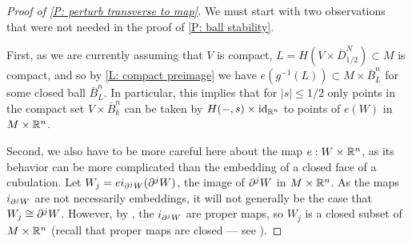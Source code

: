 \begin{proof}[Proof of \cref{P: perturb transverse to map}]
We must start with two observations that were not needed in the proof of \cref{P: ball stability}. 

First, as we are currently assuming that $V$ is compact, $L=H(V\times \bar D^N_{1/2})\subset M$ is compact, and so by \cref{L: compact preimage} we have $e(g^{-1}(L))\subset M\times \bar B^n_L$ for some closed ball $\bar B^n_L$. In particular, this implies that for $|s|\leq 1/2$ only points in the compact set $V\times \bar B^n_k$ can be taken by $H(-,s)\times \mathrm{id}_{\mathbb{R}^n}$ to points of $e(W)$ in $M\times \mathbb{R}^n$.  

Second, we also have to be more careful here about the map $e:W\times \mathbb{R}^n$, as its behavior can be more complicated than the embedding of a closed face of a cubulation. 
Let $W_j=ei_{\partial^jW}(\partial^jW)$, the image of $\partial^jW$ in $M\times \mathbb{R}^n$. As the maps $i_{\partial^jW}$ are not necessarily embeddings, it will not generally be the case that $W_j\cong \partial^jW$. However, by \cite[Lemma 2.8]{Joy12}, the $i_{\partial^jW}$ are proper maps, so $W_j$ is a closed subset of $M\times \mathbb{R}^n$ (recall that proper maps are closed --- see \cite[Section I.10]{Bou98}). 
 

\end{proof}
